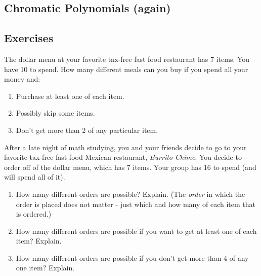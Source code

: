 \documentclass[10pt,]{book}
\theoremstyle{plain}
\theoremstyle{definition}
\theoremstyle{definition}
\theoremstyle{definition}
\theoremstyle{definition}
\numberwithin{equation}{chapter}
\begin{document}
\subsection[{Chromatic Polynomials (again)}]{Chromatic Polynomials (again)}\label{subsection-20}
\typeout{************************************************}
\typeout{************************************************}
\subsection*{Exercises}\label{exercises_counting-advPIE}
\begin{divisionexercise}{1}\hypertarget{exercise-70}{}
\hypertarget{p-918}{}%
The dollar menu at your favorite tax-free fast food restaurant has 7 items. You have \textdollar{}10 to spend. How many different meals can you buy if you spend all your money and: \leavevmode%
\begin{enumerate}[label=(\alph*)]
\item\hypertarget{li-148}{}\hypertarget{p-919}{}%
Purchase at least one of each item.%
\item\hypertarget{li-149}{}\hypertarget{p-920}{}%
Possibly skip some items.%
\item\hypertarget{li-150}{}\hypertarget{p-921}{}%
Don't get more than 2 of any particular item.%
\end{enumerate}
%
\end{divisionexercise}%
\begin{divisionexercise}{2}\hypertarget{exercise-71}{}
\hypertarget{p-923}{}%
After a late night of math studying, you and your friends decide to go to your favorite tax-free fast food Mexican restaurant, \emph{Burrito Chime}. You decide to order off of the dollar menu, which has 7 items. Your group has \textdollar{}16 to spend (and will spend all of it). \leavevmode%
\begin{enumerate}[label=(\alph*)]
\item\hypertarget{li-154}{}\hypertarget{p-924}{}%
How many different orders are possible? Explain. (The \emph{order} in which the order is placed does not matter - just which and how many of each item that is ordered.) %
\item\hypertarget{li-155}{}\hypertarget{p-925}{}%
How many different orders are possible if you want to get at least one of each item? Explain. %
\item\hypertarget{li-156}{}\hypertarget{p-926}{}%
How many different orders are possible if you don't get more than 4 of any one item? Explain. %
\end{enumerate}
%
\end{divisionexercise}%
\end{document}
